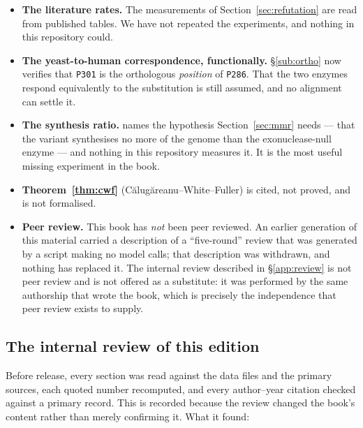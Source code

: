 \begin{itemize}[leftmargin=*,itemsep=2pt]
  \item \textbf{The literature rates.} The measurements of
        Section~\ref{sec:refutation} are read from published tables. We have not
        repeated the experiments, and nothing in this repository could.
  \item \textbf{The yeast-to-human correspondence, functionally.}
        \S\ref{sub:ortho} now verifies that \texttt{P301} is the orthologous
        \emph{position} of \texttt{P286}. That the two enzymes respond
        equivalently to the substitution is still assumed, and no alignment can
        settle it.
  \item \textbf{The synthesis ratio.} 
        names the hypothesis Section~\ref{sec:mmr} needs --- that the variant
        synthesises no more of the genome than the exonuclease-null enzyme ---
        and nothing in this repository measures it. It is the most useful
        missing experiment in the book.
  \item \textbf{Theorem~\ref{thm:cwf}} (Călugăreanu--White--Fuller) is cited, not
        proved, and is not formalised.
  \item \textbf{Peer review.} This book has \emph{not} been peer reviewed.
        An earlier generation of this material carried a description of a
        ``five-round'' review that was generated by a script making no model
        calls; that description was withdrawn, and nothing has replaced it.
        The internal review described in §\ref{app:review} is not peer review
        and is not offered as a substitute: it was performed by the same
        authorship that wrote the book, which is precisely the independence that
        peer review exists to supply.
\end{itemize}

\subsection*{The internal review of this edition}\label{app:review}

Before release, every section was read against the data files and the primary
sources, each quoted number recomputed, and every author--year citation checked
against a primary record. This is recorded because the review changed the book's
content rather than merely confirming it. What it found:

